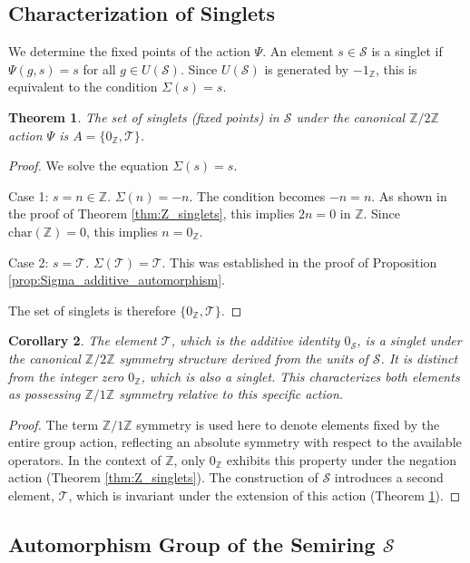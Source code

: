 \documentclass[11pt, a4paper]{article}
\theoremstyle{plain}
\newtheorem{theorem}{Theorem}[section]
\newtheorem{corollary}[theorem]{Corollary}
\theoremstyle{definition}
\numberwithin{equation}{section}
\newcommand{\Z}{\mathbb{Z}}
\newcommand{\Tobj}{\mathcal{T}} %
\newcommand{\SemiringS}{\mathcal{S}}
\newcommand{\Ztwo}{\mathbb{Z}/2\mathbb{Z}}
\newcommand{\Zone}{\mathbb{Z}/1\mathbb{Z}}
\newcommand{\Char}{\mathrm{char}}
\begin{document}
\subsection{Characterization of Singlets}

We determine the fixed points of the action $\Psi$. An element $s \in \SemiringS$ is a singlet if $\Psi(g, s)=s$ for all $g \in U(\SemiringS)$. Since $U(\SemiringS)$ is generated by $-1_{\Z}$, this is equivalent to the condition $\Sigma(s)=s$.

\begin{theorem}\label{thm:singlets_S}
The set of singlets (fixed points) in $\SemiringS$ under the canonical $\Ztwo$ action $\Psi$ is $A = \{0_{\Z}, \Tobj\}$.
\end{theorem}
\begin{proof}
We solve the equation $\Sigma(s)=s$.

Case 1: $s=n \in \Z$.
$\Sigma(n) = -n$. The condition becomes $-n=n$. As shown in the proof of Theorem \ref{thm:Z_singlets}, this implies $2n=0$ in $\Z$. Since $\Char(\Z)=0$, this implies $n=0_{\Z}$.

Case 2: $s=\Tobj$.
$\Sigma(\Tobj) = \Tobj$. This was established in the proof of Proposition \ref{prop:Sigma_additive_automorphism}.

The set of singlets is therefore $\{0_{\Z}, \Tobj\}$.
\end{proof}

\begin{corollary}
The element $\Tobj$, which is the additive identity $0_{\SemiringS}$, is a singlet under the canonical $\Ztwo$ symmetry structure derived from the units of $\SemiringS$. It is distinct from the integer zero $0_{\Z}$, which is also a singlet. This characterizes both elements as possessing $\Zone$ symmetry relative to this specific action.
\end{corollary}
\begin{proof}
The term $\Zone$ symmetry is used here to denote elements fixed by the entire group action, reflecting an absolute symmetry with respect to the available operators. In the context of $\Z$, only $0_{\Z}$ exhibits this property under the negation action (Theorem \ref{thm:Z_singlets}). The construction of $\SemiringS$ introduces a second element, $\Tobj$, which is invariant under the extension of this action (Theorem \ref{thm:singlets_S}).
\end{proof}

\subsection{Automorphism Group of the Semiring \texorpdfstring{$\SemiringS$}{S}}
\end{document}
